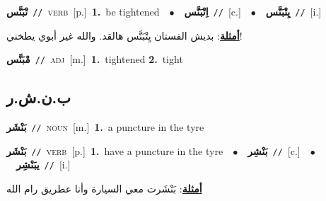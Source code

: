 \documentclass[10pt,a4paper,twoside]{article} %
\begin{document}
\begin{multicols}{2}
{\setlength\topsep{0pt}\textbf{\foreignlanguage{arabic}{تْبَنَّس}}\ {\color{gray}\texttt{//}\color{black}}\ \textsc{verb}\ [p.]\ \textbf{1.}~be tightened\ \ $\bullet$\ \ \setlength\topsep{0pt}\textbf{\foreignlanguage{arabic}{اِتْبَنَّس}}\ {\color{gray}\texttt{//}\color{black}}\ [c.]\ \ $\bullet$\ \ \setlength\topsep{0pt}\textbf{\foreignlanguage{arabic}{يِتْبَنَّس}}\ {\color{gray}\texttt{//}\color{black}}\ [i.]\  \begin{flushright}\color{gray}\foreignlanguage{arabic}{\textbf{\underline{\foreignlanguage{arabic}{أمثلة}}}: بديش الفستان يِتْبَنَّس هالقد. والله غير أبوي يطخني!}\end{flushright}\color{black}} \vspace{2mm}

{\setlength\topsep{0pt}\textbf{\foreignlanguage{arabic}{مْبَنَّس}}\ {\color{gray}\texttt{//}\color{black}}\ \textsc{adj}\ [m.]\ \textbf{1.}~tightened  \textbf{2.}~tight\ } \vspace{2mm}

\vspace{-3mm}
\subsection*{\color{blue}\foreignlanguage{arabic}{ب.ن.ش.ر}\color{blue}{}} 

{\setlength\topsep{0pt}\textbf{\foreignlanguage{arabic}{بَنْشَر}}\ {\color{gray}\texttt{//}\color{black}}\ \textsc{noun}\ [m.]\ \textbf{1.}~a puncture in the tyre\ } \vspace{2mm}

{\setlength\topsep{0pt}\textbf{\foreignlanguage{arabic}{بَنْشَر}}\ {\color{gray}\texttt{//}\color{black}}\ \textsc{verb}\ [p.]\ \textbf{1.}~have a puncture in the tyre\ \ $\bullet$\ \ \setlength\topsep{0pt}\textbf{\foreignlanguage{arabic}{بَنْشِر}}\ {\color{gray}\texttt{//}\color{black}}\ [c.]\ \ $\bullet$\ \ \setlength\topsep{0pt}\textbf{\foreignlanguage{arabic}{يبَنْشِر}}\ {\color{gray}\texttt{//}\color{black}}\ [i.]\  \begin{flushright}\color{gray}\foreignlanguage{arabic}{\textbf{\underline{\foreignlanguage{arabic}{أمثلة}}}: بَنْشَرت معي السيارة وأنا عطريق رام الله}\end{flushright}\color{black}} \vspace{2mm}


\end{multicols}
\end{document}
